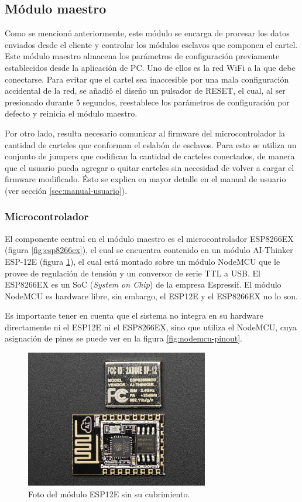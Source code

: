 \subsection{Módulo maestro}
Como se mencionó anteriormente, este módulo se encarga de procesar los datos enviados desde el cliente y controlar los módulos esclavos que componen el cartel. Este módulo maestro almacena los parámetros de configuración previamente establecidos desde la aplicación de PC. Uno de ellos es la red WiFi a la que debe conectarse. Para evitar que el cartel sea inaccesible por una mala configuración accidental de la red, se añadió el diseño un pulsador de RESET, el cual, al ser presionado durante 5 segundos, reestablece los parámetros de configuración por defecto y reinicia el módulo maestro.

Por otro lado, resulta necesario comunicar al firmware del microcontrolador la cantidad de carteles que conforman el eslabón de esclavos. Para esto se utiliza un conjunto de jumpers que codifican la cantidad de carteles conectados, de manera que el usuario pueda agregar o quitar carteles sin necesidad de volver a cargar el firmware modificado. Ésto se explica en mayor detalle en el manual de usuario (ver sección \ref{sec:manual-usuario}).

\subsubsection{Microcontrolador}
El componente central en el módulo maestro es el microcontrolador ESP8266EX (figura \ref{fig:esp8266ex}), el cual se encuentra contenido en un módulo AI-Thinker ESP-12E (figura \ref{fig:foto-esp12e}), el cual está montado sobre un módulo NodeMCU que le provee de regulación de tensión y un conversor de serie TTL a USB. El ESP8266EX es un SoC (\emph{System on Chip}) de la empresa Espressif. El módulo NodeMCU es hardware libre, sin embargo, el ESP12E y el ESP8266EX no lo son.\cite{NodeMCU}

Es importante tener en cuenta que el sistema no integra en su hardware directamente ni el ESP12E ni el ESP8266EX, sino que utiliza el NodeMCU, cuya asignación de pines se puede ver en la figura \ref{fig:nodemcu-pinout}.

\begin{figure}[ht!]
	\begin{center}
		\includegraphics[width=8cm]{imagenes/esp12e-foto.jpg}
		\caption{Foto del módulo ESP12E sin su cubrimiento.}
		\label{fig:foto-esp12e}
	\end{center}
\end{figure}

